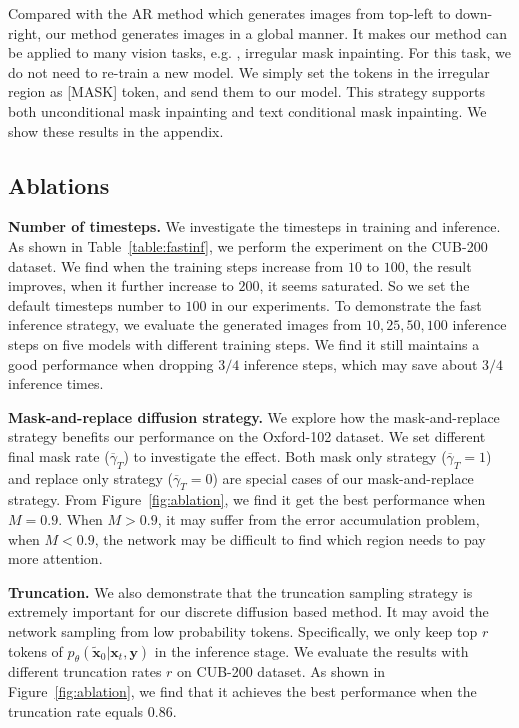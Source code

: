 Compared with the AR method which generates images from top-left to down-right, our method generates images in a global manner. It makes our method can be applied to many vision tasks, e.g. , irregular mask inpainting. For this task, we do not need to re-train a new model. We simply set the tokens in the irregular region as [MASK] token, and send them to our model. This strategy supports both unconditional mask inpainting and text conditional mask inpainting. We show these results in the appendix.

\subsection{Ablations}

 \textbf{Number of timesteps.} We investigate the timesteps in training and inference. As shown in Table~\ref{table:fastinf}, we perform the experiment on the CUB-200 dataset. We find when the training steps increase from $10$ to $100$, the result improves, when it further increase to $200$, it seems saturated. So we set the default timesteps number to $100$ in our experiments. To demonstrate the fast inference strategy, we evaluate the generated images from $10,25,50,100$ inference steps on five models with different training steps. We find it still maintains a good performance when dropping $3/4$ inference steps, which may save about $3/4$ inference times.

\textbf{Mask-and-replace diffusion strategy.} We explore how the mask-and-replace strategy benefits our performance on the Oxford-102 dataset. We set different final mask rate ($\overline\gamma_T$) to investigate the effect. Both mask only strategy ($\overline\gamma_T=1$) and replace only strategy ($\overline\gamma_T=0$) are special cases of our mask-and-replace strategy. From Figure~\ref{fig:ablation}, we find it get the best performance when $M=0.9$. When $M>0.9$, it may suffer from the error accumulation problem, when $M<0.9$, the network may be difficult to find which region needs to pay more attention.

 \textbf{Truncation.} We also demonstrate that the truncation sampling strategy is extremely important for our discrete diffusion based method. It may avoid the network sampling from low probability tokens. Specifically, we only keep top $r$ tokens of $p_\theta(\tilde{\bm{x}}_0|\bm{x}_t, \bm{y})$ in the inference stage. We evaluate the results with different truncation rates $r$ on CUB-200 dataset. As shown in Figure~\ref{fig:ablation}, we find that it achieves the best performance when the truncation rate equals $0.86$.

